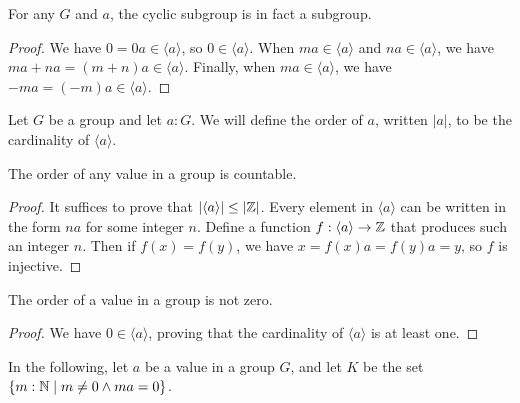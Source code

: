 \documentclass[../../math.tex]{subfiles}
\begin{document}
\begin{theorem}
    For any $G$ and $a$, the cyclic subgroup is in fact a subgroup.
\end{theorem}
\begin{proof}
    We have $0 = 0a \in \langle a \rangle$, so $0 \in \langle a \rangle$.  When
    $ma \in \langle a \rangle$ and $na \in \langle a \rangle$, we have $ma + na
    = (m + n)a \in \langle a \rangle$.  Finally, when $ma \in \langle a
    \rangle$, we have $-ma = (-m)a \in \langle a \rangle$.
\end{proof}

\begin{definition}
    Let $G$ be a group and let $a : G$.  We will define the order of $a$,
    written $|a|$, to be the cardinality of $\langle a \rangle$.
\end{definition}

\begin{theorem} \label{group_order_countable}
    The order of any value in a group is countable.
\end{theorem}
\begin{proof}
    It suffices to prove that $|\langle a \rangle| \leq |\mathbb{Z}|$.  Every element in
    $\langle a \rangle$ can be written in the form $na$ for some integer $n$.
    Define a function $f : \langle a \rangle \to \mathbb{Z}$ that produces such an
    integer $n$.  Then if $f(x) = f(y)$, we have $x = f(x)a = f(y)a = y$, so $f$
    is injective.
\end{proof}

\begin{theorem} \label{group_order_nz}
    The order of a value in a group is not zero.
\end{theorem}
\begin{proof}
    We have $0 \in \langle a \rangle$, proving that the cardinality of $\langle
    a \rangle$ is at least one.
\end{proof}

In the following, let $a$ be a value in a group $G$, and let $K$ be the set
$\{m : \mathbb{N} \mid m \neq 0 \wedge ma = 0\}$.
\end{document}
